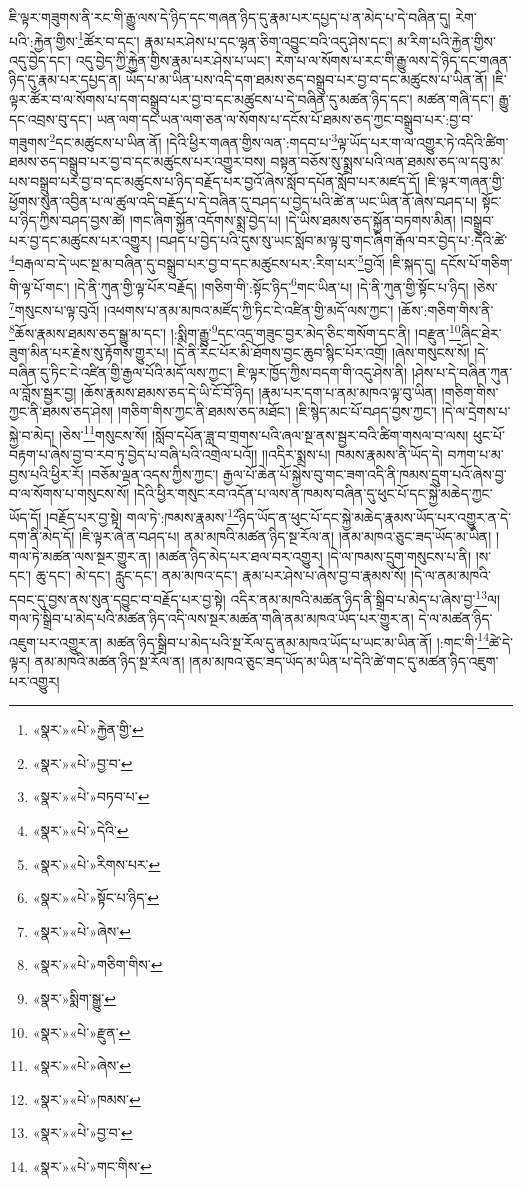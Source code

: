 ཇི་ལྟར་གཟུགས་ནི་རང་གི་རྒྱུ་ལས་དེ་ཉིད་དང་གཞན་ཉིད་དུ་རྣམ་པར་དཔྱད་པ་ན་མེད་པ་དེ་བཞིན་དུ། རེག་པའི་:རྐྱེན་གྱིས་\footnote{«སྣར་»«པེ་»རྐྱེན་གྱི་}ཚོར་བ་དང་། རྣམ་པར་ཤེས་པ་དང་ལྷན་ཅིག་འབྱུང་བའི་འདུ་ཤེས་དང་། མ་རིག་པའི་རྐྱེན་གྱིས་འདུ་བྱེད་དང་། འདུ་བྱེད་ཀྱི་རྐྱེན་གྱིས་རྣམ་པར་ཤེས་པ་ཡང་། རེག་པ་ལ་སོགས་པ་རང་གི་རྒྱུ་ལས་དེ་ཉིད་དང་གཞན་ཉིད་དུ་རྣམ་པར་དཔྱད་ན། ཡོད་པ་མ་ཡིན་པས་འདི་དག་ཐམས་ཅད་བསྒྲུབ་པར་བྱ་བ་དང་མཚུངས་པ་ཡིན་ནོ། །ཇི་ལྟར་ཚོར་བ་ལ་སོགས་པ་དག་བསྒྲུབ་པར་བྱ་བ་དང་མཚུངས་པ་དེ་བཞིན་དུ་མཚན་ཉིད་དང་། མཚན་གཞི་དང་། རྒྱུ་དང་འབྲས་བུ་དང་། ཡན་ལག་དང་ཡན་ལག་ཅན་ལ་སོགས་པ་དངོས་པོ་ཐམས་ཅད་ཀྱང་བསྒྲུབ་པར་:བྱ་བ་གཟུགས་\footnote{«སྣར་»«པེ་»བྱ་བ་}དང་མཚུངས་པ་ཡིན་ནོ། །དེའི་ཕྱིར་གཞན་གྱིས་ལན་:གདབ་པ་\footnote{«སྣར་»«པེ་»བཏབ་པ་}ལྟ་ཡོད་པར་ག་ལ་འགྱུར་ཏེ་འདིའི་ཚིག་ཐམས་ཅད་བསྒྲུབ་པར་བྱ་བ་དང་མཚུངས་པར་འགྱུར་བས། བསྟན་བཅོས་སུ་སྨྲས་པའི་ལན་ཐམས་ཅད་ལ་དབུ་མ་པས་བསྒྲུབ་པར་བྱ་བ་དང་མཚུངས་པ་ཉིད་བརྗོད་པར་བྱའོ་ཞེས་སློབ་དཔོན་སློབ་པར་མཛད་དོ། །ཇི་ལྟར་གཞན་གྱི་ཕྱོགས་སུན་འབྱིན་པ་ལ་ཚུལ་འདི་བརྗོད་པ་དེ་བཞིན་དུ་བཤད་པ་བྱེད་པའི་ཚེ་ན་ཡང་ཡིན་ནོ་ཞེས་བཤད་པ། སྟོང་པ་ཉིད་ཀྱིས་བཤད་བྱས་ཚེ། །གང་ཞིག་སྐྱོན་འདོགས་སྨྲ་བྱེད་པ། །དེ་ཡིས་ཐམས་ཅད་སྐྱོན་བཏགས་མིན། །བསྒྲུབ་པར་བྱ་དང་མཚུངས་པར་འགྱུར། །བཤད་པ་བྱེད་པའི་དུས་སུ་ཡང་སློབ་མ་ལྟ་བུ་གང་ཞིག་རྒོལ་བར་བྱེད་པ་:དེའི་ཚེ་\footnote{«སྣར་»«པེ་»དེའི་}བརྒལ་བ་དེ་ཡང་སྔ་མ་བཞིན་དུ་བསྒྲུབ་པར་བྱ་བ་དང་མཚུངས་པར་:རིག་པར་\footnote{«སྣར་»«པེ་»རིགས་པར་}བྱའོ། །ཇི་སྐད་དུ། དངོས་པོ་གཅིག་གི་ལྟ་པོ་གང་། །དེ་ནི་ཀུན་གྱི་ལྟ་པོར་བརྗོད། །གཅིག་གི་:སྟོང་ཉིད་\footnote{«སྣར་»«པེ་»སྟོང་པ་ཉིད་}གང་ཡིན་པ། །དེ་ནི་ཀུན་གྱི་སྟོང་པ་ཉིད། །ཅེས་\footnote{«སྣར་»«པེ་»ཞེས་}གསུངས་པ་ལྟ་བུའོ། །འཕགས་པ་ནམ་མཁའ་མཛོད་ཀྱི་ཏིང་ངེ་འཛིན་གྱི་མདོ་ལས་ཀྱང་། །ཆོས་:གཅིག་གིས་ནི་\footnote{«སྣར་»«པེ་»གཅིག་གིས་}ཆོས་རྣམས་ཐམས་ཅད་སྒྱུ་མ་དང་། །:སྨིག་རྒྱུ་\footnote{«སྣར་»སྨིག་སྒྱུ་}དང་འདྲ་གཟུང་བྱར་མེད་ཅིང་གསོག་དང་ནི། །བརྫུན་\footnote{«སྣར་»«པེ་»རྫུན་}ཞིང་ཐེར་ཟུག་མིན་པར་རྗེས་སུ་རྟོགས་གྱུར་པ། །དེ་ནི་རིང་པོར་མི་ཐོགས་བྱང་ཆུབ་སྙིང་པོར་འགྲོ། །ཞེས་གསུངས་སོ། །དེ་བཞིན་དུ་ཏིང་ངེ་འཛིན་གྱི་རྒྱལ་པོའི་མདོ་ལས་ཀྱང་། ཇི་ལྟར་ཁྱོད་ཀྱིས་བདག་གི་འདུ་ཤེས་ནི། །ཤེས་པ་དེ་བཞིན་ཀུན་ལ་བློས་སྦྱར་བྱ། །ཆོས་རྣམས་ཐམས་ཅད་དེ་ཡི་ངོ་བོ་ཉིད། །རྣམ་པར་དག་པ་ནམ་མཁའ་ལྟ་བུ་ཡིན། །གཅིག་གིས་ཀྱང་ནི་ཐམས་ཅད་ཤེས། །གཅིག་གིས་ཀྱང་ནི་ཐམས་ཅད་མཐོང་། །ཇི་སྙེད་མང་པོ་བཤད་བྱས་ཀྱང་། །དེ་ལ་དྲེགས་པ་སྐྱེ་བ་མེད། །ཅེས་\footnote{«སྣར་»«པེ་»ཞེས་}གསུངས་སོ། །སློབ་དཔོན་ཟླ་བ་གྲགས་པའི་ཞལ་སྔ་ནས་སྦྱར་བའི་ཚིག་གསལ་བ་ལས། ཕུང་པོ་བརྟག་པ་ཞེས་བྱ་བ་རབ་ཏུ་བྱེད་པ་བཞི་པའི་འགྲེལ་པའོ།། །།འདིར་སྨྲས་པ། ཁམས་རྣམས་ནི་ཡོད་དེ། བཀག་པ་མ་བྱས་པའི་ཕྱིར་རོ། །བཅོམ་ལྡན་འདས་ཀྱིས་ཀྱང་། རྒྱལ་པོ་ཆེན་པོ་སྐྱེས་བུ་གང་ཟག་འདི་ནི་ཁམས་དྲུག་པའོ་ཞེས་བྱ་བ་ལ་སོགས་པ་གསུངས་སོ། །དེའི་ཕྱིར་གསུང་རབ་འདོན་པ་ལས་ན་ཁམས་བཞིན་དུ་ཕུང་པོ་དང་སྐྱེ་མཆེད་ཀྱང་ཡོད་དོ། །བརྗོད་པར་བྱ་སྟེ། གལ་ཏེ་:ཁམས་རྣམས་\footnote{«སྣར་»«པེ་»ཁམས་}ཉིད་ཡོད་ན་ཕུང་པོ་དང་སྐྱེ་མཆེད་རྣམས་ཡོད་པར་འགྱུར་ན་དེ་དག་ནི་མེད་དོ། །ཇི་ལྟར་ཞེ་ན་བཤད་པ། ནམ་མཁའི་མཚན་ཉིད་སྔ་རོལ་ན། །ནམ་མཁའ་ཅུང་ཟད་ཡོད་མ་ཡིན། །གལ་ཏེ་མཚན་ལས་སྔར་གྱུར་ན། །མཚན་ཉིད་མེད་པར་ཐལ་བར་འགྱུར། །དེ་ལ་ཁམས་དྲུག་གསུངས་པ་ནི། །ས་དང་། ཆུ་དང་། མེ་དང་། རླུང་དང་། ནམ་མཁའ་དང་། རྣམ་པར་ཤེས་པ་ཞེས་བྱ་བ་རྣམས་སོ། །དེ་ལ་ནམ་མཁའི་དབང་དུ་བྱས་ནས་སུན་དབྱུང་བ་བརྗོད་པར་བྱ་སྟེ། འདིར་ནམ་མཁའི་མཚན་ཉིད་ནི་སྒྲིབ་པ་མེད་པ་ཞེས་བྱ་\footnote{«སྣར་»«པེ་»བྱ་བ་}ལ། གལ་ཏེ་སྒྲིབ་པ་མེད་པའི་མཚན་ཉིད་འདི་ལས་སྔར་མཚན་གཞི་ནམ་མཁའ་ཡོད་པར་གྱུར་ན། དེ་ལ་མཚན་ཉིད་འཇུག་པར་འགྱུར་ན། མཚན་ཉིད་སྒྲིབ་པ་མེད་པའི་སྔ་རོལ་དུ་ནམ་མཁའ་ཡོད་པ་ཡང་མ་ཡིན་ནོ། །:གང་གི་\footnote{«སྣར་»«པེ་»གང་གིས་}ཚེ་དེ་ལྟར། ནམ་མཁའི་མཚན་ཉིད་སྔ་རོལ་ན། །ནམ་མཁའ་ཅུང་ཟད་ཡོད་མ་ཡིན་པ་དེའི་ཚེ་གང་དུ་མཚན་ཉིད་འཇུག་པར་འགྱུར། 